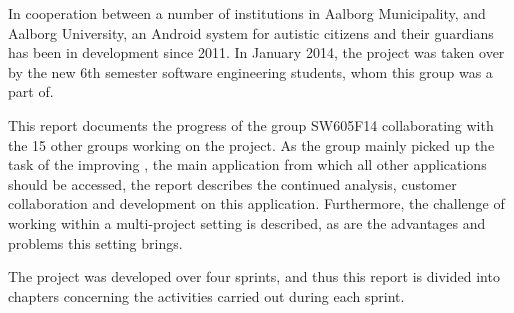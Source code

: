 In cooperation between a number of institutions in Aalborg Municipality, and Aalborg University, an Android system for autistic citizens and their guardians has been in development since 2011.
In January 2014, the project was taken over by the new 6th semester software engineering students, whom this group was a part of.

This report documents the progress of the group SW605F14 collaborating with the 15 other groups working on the project.
As the group mainly picked up the task of the improving \launcher, the main application from which all other applications should be accessed, the report describes the continued analysis, customer collaboration and development on this application.
Furthermore, the challenge of working within a multi-project setting is described, as are the advantages and problems this setting brings.

The project was developed over four sprints, and thus this report is divided into chapters concerning the activities carried out during each sprint.